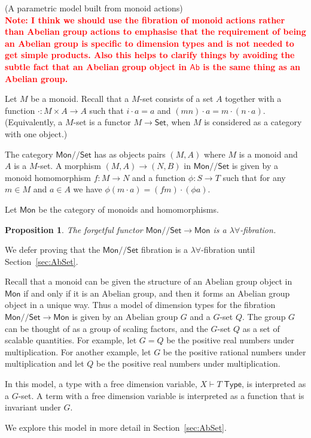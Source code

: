 \documentclass[a4paper,UKenglish]{lipics}
\newtheorem{proposition}[theorem]{Proposition}
\newcommand\note[1]{{ \bf \textcolor{red} {\vspace{2mm}\; \\ Note: #1\\}}}
\newcommand{\msf}[1]{\mathsf{#1}} %
\newcommand{\Mon}{\msf{Mon}}
\newcommand{\Ab}{\msf{Ab}}
\newcommand{\Set}{\msf{Set}}
\newcommand{\GroupSet}[1]{#1/\!/\Set}
\newcommand{\MonSet}{\GroupSet{\Mon}}
\newcommand{\Tj}[2]{#1 \vdash #2 \; \msf{ Type}}
\newcommand{\Dvar}{X}
\begin{document}
\begin{example}(A parametric model built from monoid actions)
\note{I think we should use the fibration of monoid actions rather than Abelian group actions to emphasise that the requirement of being an Abelian group is specific to dimension types and is not needed to get simple products. Also this helps to clarify things by avoiding the subtle fact that an Abelian group object in $\Ab$ is the same thing as an Abelian group.}
\begin{definition}
Let $M$ be a monoid. Recall that a $M$-set consists of a
set $A$ together with a function $\cdot:M\times A\to A$ such that
$i\cdot a=a$ and $(mn)\cdot a=m\cdot (n\cdot a)$.
(Equivalently, a $M$-set is a functor $M\to\Set$, when $M$ is considered
as a category with one object.)

The category $\MonSet$ has as objects pairs $(M,A)$ where $M$ is a
monoid and $A$ is a $M$-set. A morphism $(M,A) \rightarrow
(N,B)$ in $\MonSet$ is given by a monoid homomorphism $f:M\rightarrow N$
and a function $\phi:S \rightarrow T$ such that for any
 $m\in M$ and $a\in A$ we have
$\phi (m\cdot a) = (f m)\cdot (\phi a)$.
\end{definition}

Let $\Mon$ be the category of monoids and homomorphisms.
\begin{proposition}
The forgetful functor $\MonSet\to \Mon$ is a $\lambda\forall$-fibration.
\end{proposition}
We defer proving that the $\MonSet$ fibration is a $\lambda\forall$-fibration
until Section~\ref{sec:AbSet}.

Recall that a monoid can be given the structure of an
Abelian group object in $\Mon$ if and only if it is an Abelian group,
and then it forms an Abelian group object in a unique way.
Thus a model of dimension types
for the fibration $\MonSet\to\Mon$ is given by
an Abelian group $G$ and a $G$-set $Q$.
The group $G$ can be thought of as a group of scaling factors,
and the $G$-set $Q$ as a set of scalable quantities.
For example, let $G=Q$ be the positive real numbers under multiplication.
For another example,
let $G$ be the positive rational numbers under multiplication and let
$Q$ be the positive real numbers under multiplication.

In this model, a type with a free dimension variable,
$\Tj\Dvar T$, is interpreted as a $G$-set.
A term with a free dimension variable is interpreted as a
function that is invariant under $G$.

We explore this model in more detail in Section~\ref{sec:AbSet}.
\end{example}
\end{document}
